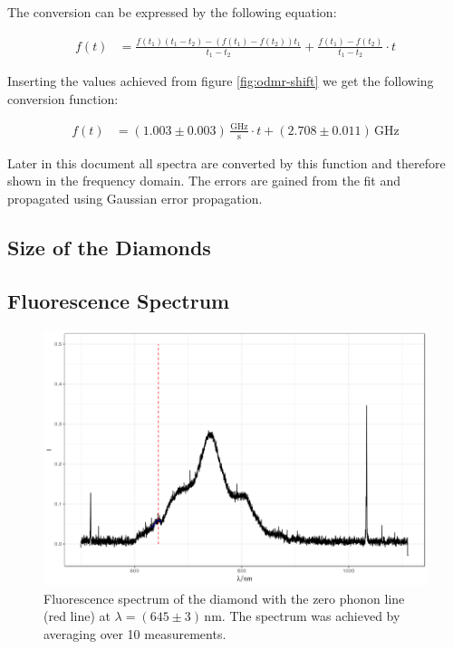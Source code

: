 The conversion can be expressed by the following equation:

\begin{align}
	f(t)&=\frac{f(t_1)(t_1-t_2)-(f(t_1)-f(t_2))t_1}{t_1-t_2}+\frac{f(t_1)-f(t_2)}{t_1-t_2}\cdot t
\end{align}

Inserting the values achieved from figure \ref{fig:odmr-shift} we get the following conversion function:

\begin{align}
	f(t)&=(1.003\pm0.003)\,\mathrm{\frac{GHz}{s}}\cdot t+(2.708\pm0.011)\,\mathrm{GHz}
\end{align}

Later in this document all spectra are converted by this function and therefore shown in the frequency domain. The errors are gained from the fit and propagated using Gaussian error propagation.

\subsection{Size of the Diamonds}

\subsection{Fluorescence Spectrum}
\begin{figure}
	\centering
	\includegraphics[width=\textwidth]{../figures/fluorescence.png}
	\caption[Fluorescence spectrum of the diamond]{Fluorescence spectrum of the diamond with the zero phonon line (red line) at $\lambda=(645\pm3)\,\mathrm{nm}$. The spectrum was achieved by averaging over 10 measurements.}
	\label{fig:fluorescence}
\end{figure}

